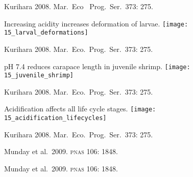 \documentclass[t,handout]{beamer}  %
\begin{document}
%
{
\begin{frame}[b]

\hfill \tiny {}
\end{frame}
}

%

{
\begin{frame}[b]

\hfill \tiny Kurihara 2008. Mar.~Eco~ Prog.~Ser.~373: 275.  

\end{frame}
}
%
\begin{frame}{Increasing acidity increases deformation of larvae.}
\texttt{[image: 15\_larval\_deformations]}

\vfilll

\hfill \tiny Kurihara 2008. Mar.~Eco.~Prog.~Ser.~373: 275. 
\end{frame}
%
\begin{frame}{pH 7.4 reduces carapace length in juvenile shrimp.}
\texttt{[image: 15\_juvenile\_shrimp]}

\vfilll

\hfill \tiny Kurihara 2008. Mar.~Eco.~Prog.~Ser.~373: 275. 
\end{frame}
%
\begin{frame}{Acidification affects all life cycle stages.}
\texttt{[image: 15\_acidification\_lifecycles]}

\vfilll

\hfill \tiny Kurihara 2008. Mar.~Eco.~Prog.~Ser.~373: 275. 
\end{frame}
%
{
\begin{frame}[b]

\hfill \tiny {}
\end{frame}
}

%

{
\begin{frame}[b]

\hfill \tiny Munday et al.~2009. \textsc{pnas} 106: 1848.  

\end{frame}
}

%

{
\begin{frame}[b]

\hfill \tiny Munday et al.~2009. \textsc{pnas} 106: 1848.  

\end{frame}
}

%
\end{document}
